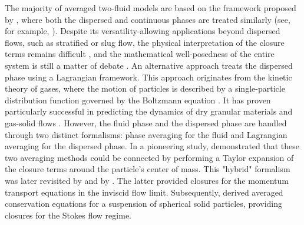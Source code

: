 The majority of averaged two-fluid models are based on the framework proposed by \citet{drew1983mathematical}, where both the dispersed and continuous phases are treated similarly (see, for example, \citet{hu2021cfd}). 
Despite its versatility-allowing applications beyond dispersed flows, such as stratified or slug flow, the physical interpretation of the closure terms remains difficult \citep{drew1983mathematical}, and the mathematical well-posedness of the entire system is still a matter of debate \citep{panicker2018hyperbolicity, lhuillier2013}.
An alternative approach treats the dispersed phase using a Lagrangian framework. 
This approach originates from the kinetic theory of gases, where the motion of particles is described by a single-particle distribution function governed by the Boltzmann equation \citep{chapman1990mathematical}. 
It has proven particularly successful in predicting the dynamics of dry granular materials \citep{rao2008introduction} and gas-solid flows \citep{simonin1996}. 
However, the fluid phase and the dispersed phase are handled through two distinct formalisms: phase averaging for the fluid and Lagrangian averaging for the dispersed phase.
In a pioneering study, \citet{buyevich1979flow} demonstrated that these two averaging methods could be connected by performing a Taylor expansion of the closure terms around the particle’s center of mass. 
This "hybrid" formalism was later revisited by \citet{lhuillier1992ensemble} and by \citet{zhang1994averaged, zhang1994ensemble}. The latter provided closures for the momentum transport equations in the inviscid flow limit. 
Subsequently, \citet{jackson1997locally} derived averaged conservation equations for a suspension of spherical solid particles, providing closures for the Stokes flow regime.


